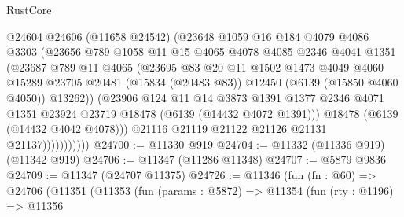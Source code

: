 \begin{lexlean}{RustCore}
\begin{coremodule}
                        @24604
                        @24606
                        (@11658 @24542)
                        (@23648
                          @1059
                          @16
                          @184
                          @4079
                          @4086
                          @3303
                          (@23656
                            @789
                            @1058
                            @11
                            @15
                            @4065
                            @4078
                            @4085
                            @2346
                            @4041
                            @1351
                            (@23687
                              @789
                              @11
                              @4065
                              (@23695
                                @83
                                @20
                                @11
                                @1502
                                @1473
                                @4049
                                @4060
                                @15289
                                @23705
                                @20481
                                (@15834 (@20483 @83))
                                @12450
                                (@6139 (@15850 @4060 @4050))
                                @13262))
                            (@23906
                              @124
                              @11
                              @14
                              @3873
                              @1391
                              @1377
                              @2346
                              @4071
                              @1351
                              @23924
                              @23719
                              @18478
                              (@6139 (@14432 @4072 @1391)))
                            @18478
                            (@6139 (@14432 @4042 @4078)))
                          @21116
                          @21119
                          @21122
                          @21126
                          @21131
                          @21137)))))))))))
@24700 := @11330 @919
@24704 := @11332 (@11336 @919) (@11342 @919)
@24706 := @11347 (@11286 @11348)
@24707 := @5879 @9836
@24709 := @11347 (@24707 @11375)
@24726 := @11346
    (fun (fn : @60) =>
    @24706
      (@11351
        (@11353
          (fun (params : @5872) =>
          @11354
            (fun (rty : @1196) =>
            @11356

\end{coremodule}
\end{lexlean}
